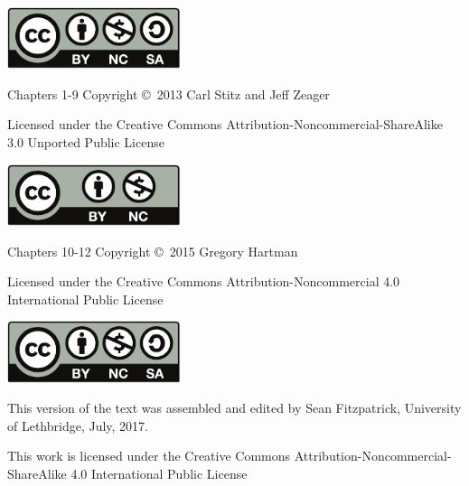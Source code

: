 \noindent\hskip -1in\begin{minipage}{2.2in}
\begin{center}
\includegraphics[width=2in]{figures/license}
\end{center}
\end{minipage}
\begin{minipage}{3.3in}
Chapters 1-9 Copyright \copyright\ 2013 Carl Stitz and Jeff Zeager

Licensed under the Creative Commons Attribution-Noncommercial-ShareAlike 3.0 Unported Public License
\end{minipage}

\bigskip

\bigskip

\bigskip


\noindent\hskip-1in\begin{minipage}{2.2in}
\begin{center}
\includegraphics[width=2in]{text/by-nc} 
\end{center}
\end{minipage}
\begin{minipage}{3.3in}
Chapters 10-12 Copyright \copyright\ 2015 Gregory Hartman

Licensed under the Creative Commons Attribution-Noncommercial 4.0 International Public License
\end{minipage}

\bigskip

\bigskip

\bigskip

\noindent\hskip-1in\begin{minipage}{2.2in}
\begin{center}
\includegraphics[width=2in]{figures/license}
\end{center}
\end{minipage}
\begin{minipage}{3.3in}
This version of the text was assembled and edited by Sean Fitzpatrick, University of Lethbridge, July, 2017. 

This work is licensed under the Creative Commons Attribution-Noncommercial-ShareAlike 4.0 International Public License
\end{minipage}

